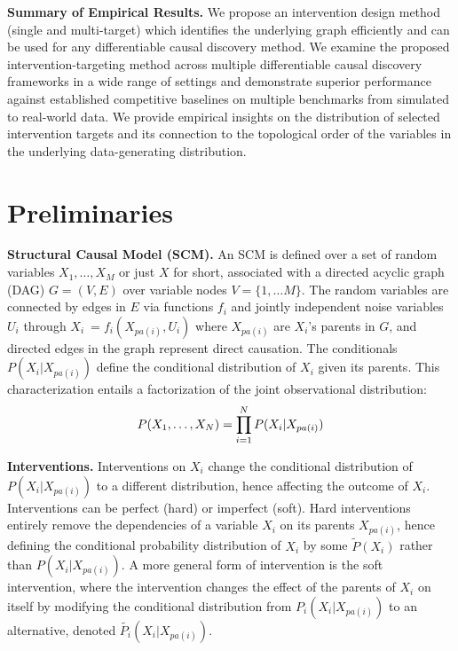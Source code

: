 \documentclass[nohyperref]{article}
\theoremstyle{plain}
\theoremstyle{definition}
\theoremstyle{remark}
\begin{document}
\textbf{Summary of Empirical Results.} We propose an %
intervention design method (single and multi-target) which identifies the underlying graph efficiently and can be used for any differentiable causal discovery method. We examine the proposed intervention-targeting method across multiple differentiable causal discovery frameworks in a wide range of settings and demonstrate superior performance against established competitive baselines on multiple benchmarks from simulated to real-world data. We provide empirical insights on the distribution of selected intervention targets and its connection to the topological order of the variables in the underlying data-generating distribution.


\vspace{-3mm}
\section{Preliminaries}

\textbf{Structural Causal Model (SCM).} An SCM \citep{peters2017elements} is defined over a set of random variables $X_1, \ldots, X_M$ or just $X$ for short, associated with a directed acyclic graph (DAG) $G=(V,E)$ over  variable nodes $V=\{1, \ldots M\}$. The random variables are connected by edges in $E$ via functions $f_i$ and jointly independent noise variables $U_i$ through
$X_i \:= f_i(X_{pa(i)}, U_i)$
where $X_{pa(i)}$ are $X_i$'s parents in $G$, and directed edges in the graph represent direct causation. The conditionals $P(X_i|X_{pa(i)})$ define the conditional distribution of $X_i$ given its parents. This characterization entails a factorization of the joint observational distribution:
\vspace{-2mm}
\[
    \footnotesize
    P(X_1, \ldots, X_N) = \prod_{i=1}^{N} P(X_i|X_{pa(i)}) 
\]
\vspace{-5mm}

\textbf{Interventions.}
Interventions on $X_i$ change the conditional distribution of $P(X_i|X_{pa(i)})$ to a different distribution, hence affecting the outcome of $X_i$. Interventions can be perfect (hard) or imperfect (soft). Hard interventions entirely remove the dependencies of a variable $X_i$ on its parents $X_{pa(i)}$, hence defining the conditional probability distribution of $X_i$ by some $\tilde{P}(X_i)$ rather than $P(X_i|X_{pa(i)})$. A more general form of intervention is the soft intervention, where the intervention changes the effect of the parents of $X_i$ on itself by modifying the conditional distribution from $P_i(X_i|X_{pa(i)})$ to an alternative, denoted $\tilde{P_i}(X_i|X_{pa(i)})$. 
\end{document}
